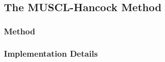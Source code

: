 \subsection{The MUSCL-Hancock Method} \label{chap:MUSCL-hancock}











\subsubsection{Method}








\subsubsection{Implementation Details}
